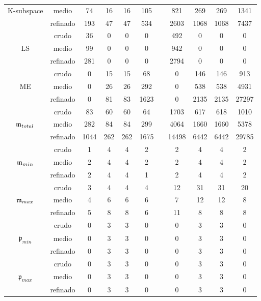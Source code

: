 \begin{table}
\begin{adjustbox}{width=0.95\columnwidth,center}
\begin{tabular}{ccccccccccc}
			K-subspace & medio & 74 & 16 & 16 & 105 &  & 821 & 269 & 269 & 1341 \\
			& refinado & 193 & 47 & 47 & 534 &  & 2603 & 1068 & 1068 & 7437 \\
			\hline
			& crudo & 36 & 0 & 0 & 0 &  & 492 & 0 & 0 & 0 \\
			LS & medio & 99 & 0 & 0 & 0 &  & 942 & 0 & 0 & 0 \\
			& refinado & 281 & 0 & 0 & 0 &  & 2794 & 0 & 0 & 0 \\
			\hline
			& crudo & 0 & 15 & 15 & 68 &  & 0 & 146 & 146 & 913 \\
			ME & medio & 0 & 26 & 26 & 292 &  & 0 & 538 & 538 & 4931 \\
			& refinado & 0 & 81 & 83 & 1623 &  & 0 & 2135 & 2135 & 27297 \\
			\hline
			& crudo & 83 & 60 & 60 & 64 &  & 1703 & 617 & 618 & 1010 \\
			$\mathfrak{m}_{total}$ & medio & 282 & 84 & 84 & 299 &  & 4064 & 1660 & 1660 & 5378 \\
			& refinado & 1044 & 262 & 262 & 1675 &  & 14498 & 6442 & 6442 & 29785 \\
			\hline
			& crudo & 1 & 4 & 4 & 2 &  & 2 & 4 & 4 & 2 \\
			$\mathfrak{m}_{min}$ & medio & 2 & 4 & 4 & 2 &  & 2 & 4 & 4 & 2 \\
			& refinado & 2 & 4 & 4 & 1 &  & 2 & 4 & 4 & 2 \\
			\hline
			& crudo & 3 & 4 & 4 & 4 &  & 12 & 31 & 31 & 20 \\
			$\mathfrak{m}_{max}$ & medio & 4 & 6 & 6 & 6 &  & 7 & 12 & 12 & 8 \\
			& refinado & 5 & 8 & 8 & 6 &  & 11 & 8 & 8 & 8 \\
			\hline
			& crudo & 0 & 3 & 3 & 0 &  & 0 & 3 & 3 & 0 \\
			$\mathfrak{p}_{min}$ & medio & 0 & 3 & 3 & 0 &  & 0 & 3 & 3 & 0 \\
			& refinado & 0 & 3 & 3 & 0 &  & 0 & 3 & 3 & 0 \\
			\hline
			& crudo & 0 & 3 & 3 & 0 &  & 0 & 3 & 3 & 0 \\
			$\mathfrak{p}_{max}$ & medio & 0 & 3 & 3 & 0 &  & 0 & 3 & 3 & 0 \\
			& refinado & 0 & 3 & 3 & 0 &  & 0 & 3 & 3 & 0 \\
			\hline
		\end{tabular}
	\end{adjustbox}
\end{table}

